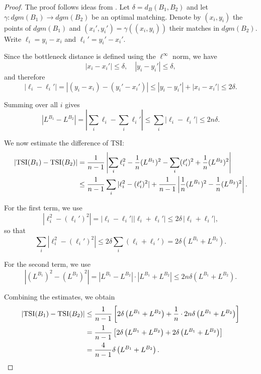 \documentclass[11pt]{amsart}
\theoremstyle{definition}
\newcommand{\tsi}[0]{\textup{TSI}}
\begin{document}
\begin{proof}
The proof follows ideas from \cite{atienza_persistent_2019}.
Let $\delta=d_B(B_1,B_2)$ and let $\gamma:dgm(B_1)\to dgm(B_2)$ be an optimal matching. Denote by $(x_i,y_i)$ the points of $dgm(B_1)$ and $(x_i',y_i')=\gamma((x_i,y_i))$ their matches in $dgm(B_2)$. Write $\ell_i=y_i-x_i$ and $\ell_i'=y_i'-x_i'$.

Since the bottleneck distance is defined using the $\ell^\infty$ norm, we have
\[
|x_i-x_i'|\leq \delta, \quad |y_i-y_i'|\leq \delta,
\]
and therefore
\[
|\ell_i-\ell_i'|
= |(y_i-x_i)-(y_i'-x_i')|
\leq |y_i-y_i'|+|x_i-x_i'|
\leq 2\delta.
\]

Summing over all $i$ gives
\[
|L^{B_1}-L^{B_2}|
= \left|\sum_i \ell_i - \sum_i \ell_i'\right|
\leq \sum_i |\ell_i-\ell_i'|
\leq 2n\delta.
\]

We now estimate the difference of TSI:
\begin{align*}
|\tsi(B_1)-\tsi(B_2)|
&=\frac{1}{n-1}\left|\sum_i \ell_i^2 - \frac{1}{n}(L^{B_1})^2
-\sum_i (\ell_i')^2 + \frac{1}{n}(L^{B_2})^2\right|\\
&\leq \frac{1}{n-1}\sum_i |\ell_i^2-(\ell_i')^2|
+\frac{1}{n-1}\left|\frac{1}{n}(L^{B_1})^2-\frac{1}{n}(L^{B_2})^2\right|.
\end{align*}

For the first term, we use
\[
|\ell_i^2-(\ell_i')^2|
=|\ell_i-\ell_i'||\ell_i+\ell_i'|
\leq 2\delta\,|\ell_i+\ell_i'|,
\]
so that
\[
\sum_i |\ell_i^2-(\ell_i')^2|
\leq 2\delta \sum_i (\ell_i+\ell_i')
=2\delta\left(L^{B_1}+L^{B_2}\right).
\]

For the second term, we use
\[
|(L^{B_1})^2-(L^{B_2})^2|
=|L^{B_1}-L^{B_2}|\cdot|L^{B_1}+L^{B_2}|
\leq 2n\delta\left(L^{B_1}+L^{B_2}\right).
\]

Combining the estimates, we obtain
\begin{align*}
|\tsi(B_1)-\tsi(B_2)|
&\leq \frac{1}{n-1}\left[
2\delta\left(L^{B_1}+L^{B_2}\right)
+\frac{1}{n}\cdot 2n\delta\left(L^{B_1}+L^{B_2}\right)
\right]\\
&=\frac{1}{n-1}\left[
2\delta\left(L^{B_1}+L^{B_2}\right)
+2\delta\left(L^{B_1}+L^{B_2}\right)
\right]\\
&=\frac{4}{n-1}\delta\left(L^{B_1}+L^{B_2}\right).
\end{align*}
\end{proof}

\end{document}
